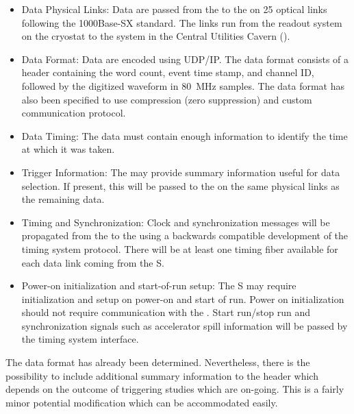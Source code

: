 \begin{itemize}

\item Data Physical Links: Data are passed from the  to the  on 25 optical links following the 1000Base-SX standard. The links run from the  readout system on the cryostat to the  system in the Central Utilities Cavern ().

\item Data Format: Data are encoded using UDP/IP.  The data format consists of a header containing the word count, event time stamp, and channel ID, followed by the digitized waveform in \SI{80}{MHz} samples.
The data format has also been specified to use compression (zero suppression) and custom communication protocol.

\item Data Timing: The data must contain enough information to identify the time at which it was taken.

\item Trigger Information: The  may provide summary information useful for data selection. If present, this will be passed to the  on the same physical links as the remaining data.

\item Timing and Synchronization: Clock and synchronization messages will be propagated from the  to the  using a backwards compatible development of the  timing system protocol\cite{bib:docdb1651}. There will be at least one timing fiber available for each data link coming from the S. 

\item Power-on initialization and start-of-run setup:  The S may require initialization and setup on power-on and start of run. Power on initialization should not require communication with the . Start run/stop run and synchronization signals such as accelerator spill information will be passed by the timing system interface.

\end{itemize}

The data format has already been determined. Nevertheless, there is the possibility to include additional summary information to the header which depends on the outcome of triggering studies which are on-going. This is a fairly minor potential modification which can be accommodated easily.

